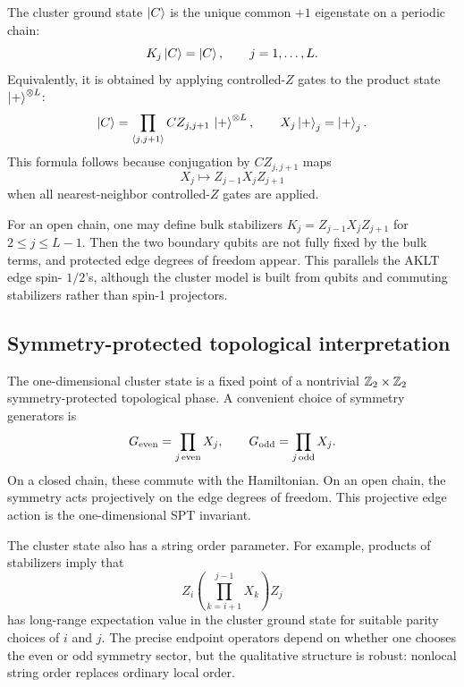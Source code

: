 The cluster ground state \(\left|C\right\rangle\) is the unique common \(+1\) eigenstate on a
periodic chain:
\begin{equation}
\label{eq:cluster-ground-state-stabilizer}
    K_j\left|C\right\rangle=\left|C\right\rangle,
    \qquad
    j=1,\ldots,L .
\end{equation}
Equivalently, it is obtained by applying controlled-\(Z\) gates to the product
state \(\left|+\right\rangle^{\otimes L}\):
\begin{equation}
\label{eq:cluster-state-cz-construction}
    \left|C\right\rangle
    =
    \prod_{\langle j,j+1\rangle} CZ_{j,j+1}\,
    \left|+\right\rangle^{\otimes L},
    \qquad
    X_j\left|+\right\rangle_j=\left|+\right\rangle_j .
\end{equation}
This formula follows because conjugation by \(CZ_{j,j+1}\) maps
\begin{equation}
\label{eq:cz-pauli-conjugation}
    X_j
    \longmapsto
    Z_{j-1}X_jZ_{j+1}
\end{equation}
when all nearest-neighbor controlled-\(Z\) gates are applied.

\begin{remark}
For an open chain, one may define bulk stabilizers
\(K_j=Z_{j-1}X_jZ_{j+1}\) for \(2\leq j\leq L-1\).  Then the two boundary qubits
are not fully fixed by the bulk terms, and protected edge degrees of freedom
appear.  This parallels the AKLT edge spin-
\(1/2\)'s, although the cluster model is built from qubits and commuting
stabilizers rather than spin-1 projectors.
\end{remark}

\subsection{Symmetry-protected topological interpretation}
\label{subsec:cluster-spt}

The one-dimensional cluster state is a fixed point of a nontrivial
\(\mathbb{Z}_2\times\mathbb{Z}_2\) symmetry-protected topological phase.  A convenient choice
of symmetry generators is
\begin{equation}
\label{eq:cluster-z2xz2-symmetry}
    G_{\rm even}=\prod_{j\,\text{even}}X_j,
    \qquad
    G_{\rm odd}=\prod_{j\,\text{odd}}X_j .
\end{equation}
On a closed chain, these commute with the Hamiltonian.  On an open chain, the
symmetry acts projectively on the edge degrees of freedom.  This projective edge
action is the one-dimensional SPT invariant.

The cluster state also has a string order parameter.  For example, products of
stabilizers imply that
\begin{equation}
\label{eq:cluster-string-order}
    Z_i
    \left(\prod_{k=i+1}^{j-1}X_k\right)
    Z_j
\end{equation}
has long-range expectation value in the cluster ground state for suitable parity
choices of \(i\) and \(j\).  The precise endpoint operators depend on whether
one chooses the even or odd symmetry sector, but the qualitative structure is
robust: nonlocal string order replaces ordinary local order.

